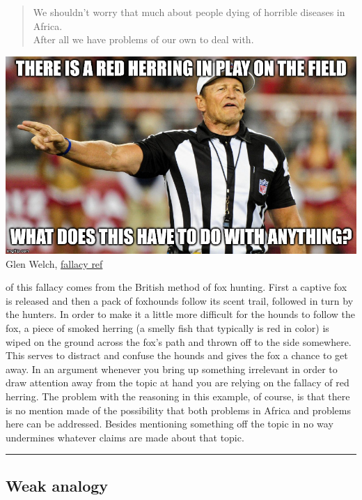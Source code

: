 \documentclass[justified]{tufte-book}
\newenvironment{argument}{\begin{quote}\normalsize}{\end{quote}}
\begin{document}
\begin{argument}
We shouldn't worry that much about people dying of horrible diseases in
Africa.\\
After all we have problems of our own to deal with.
\end{argument}

\begin{marginfigure}
\includegraphics{img/fallacies/red-herring.jpg}\\
Glen Welch, \href{https://twitter.com/fallacy_ref?lang=en}{fallacy ref}
\end{marginfigure}

 of this fallacy comes from the British method of fox hunting. First a captive fox is released and then a pack of foxhounds follow its scent trail, followed in turn by the hunters. In order to make it a little more difficult for the hounds to follow the fox, a piece of smoked herring (a smelly fish that typically is red in color) is wiped on the ground across the fox's path and thrown off to the side somewhere. This serves to distract and confuse the hounds and gives the fox a chance to get away. In an argument whenever you bring up something irrelevant in order to draw attention away from the topic at hand you are relying on the fallacy of red herring. The problem with the reasoning in this example, of course, is that there is no mention made of the possibility that both problems in Africa and problems here can be addressed. Besides mentioning something off the topic in no way undermines whatever claims are made about that topic.

\begin{center}\rule{0.5\linewidth}{\linethickness}\end{center}

\hypertarget{weak-analogy}{%
\subsection*{Weak analogy}\label{weak-analogy}}
\end{document}
